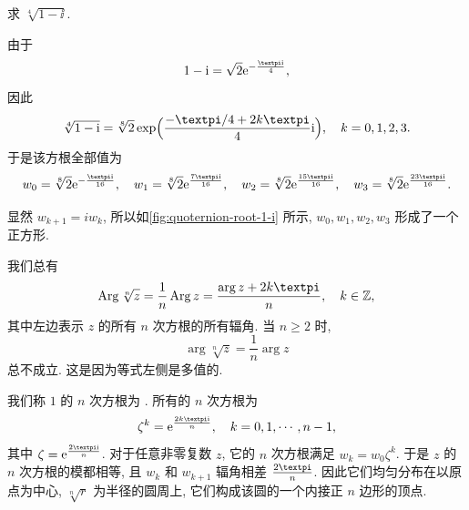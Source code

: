 
\begin{example}
  求 $\sqrt[4]{1-\ii}$.
\end{example}

\begin{solution}
  由于
  \[
    1-\ii=\sqrt2\ee^{-\frac{\cpi \ii}4},
  \]
  因此
  \[
     \sqrt[4]{1-\ii}
    =\sqrt[8]2\exp\Bigl(\frac{-\cpi/4+2k\cpi}4\ii\Bigr),\quad k=0,1,2,3.
  \]
  于是该方根全部值为
  \[
    w_0=\sqrt[8]2\ee^{-\frac{\cpi \ii}{16}},\quad
    w_1=\sqrt[8]2\ee^{\frac{7\cpi \ii}{16}},\quad
    w_2=\sqrt[8]2\ee^{\frac{15\cpi \ii}{16}},\quad
    w_3=\sqrt[8]2\ee^{\frac{23\cpi \ii}{16}}.
  \]
\end{solution}

显然 $w_{k+1}=iw_k$, 所以如\ref{fig:quoternion-root-1-i} 所示, $w_0,w_1,w_2,w_3$ 形成了一个正方形.

我们总有
\begin{equation}
  \label{eq:Arg-root-equality}
  \Arg \sqrt[n]z=\frac1n\Arg z=\frac{\arg z+2k\cpi}n,\quad k\in\BZ,
\end{equation}
其中左边表示 $z$ 的所有 $n$ 次方根的所有辐角.
当 $n\ge 2$ 时,
\[
  \arg \sqrt[n]z=\frac 1n\arg z
\]
\alert{总不成立}. 这是因为等式左侧是多值的.

我们称 $1$ 的 $n$ 次方根为 .
所有的 $n$ 次方根为
\[
  \zeta^k=\ee^{\frac{2k\cpi \ii}n},\quad k=0,1,\cdots,n-1,
\]
其中 $\zeta=\ee^{\frac{2\cpi \ii}n}$.
对于任意非零复数 $z$, 它的 $n$ 次方根满足 $w_k=w_0\zeta^k$.
于是 $z$ 的 $n$ 次方根的模都相等, 且 $w_k$ 和 $w_{k+1}$ 辐角相差 $\frac{2\cpi}n$.
因此\alert{它们均匀分布在以原点为中心, $\sqrt[n]r$ 为半径的圆周上}, 它们构成该圆的一个内接正 $n$ 边形的顶点.

